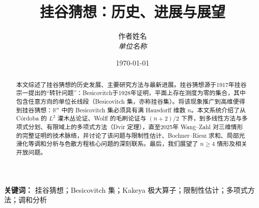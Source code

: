 \documentclass[12pt,a4paper]{article}
\title{挂谷猜想：历史、进展与展望}
\author{
    作者姓名\\
    \textit{单位名称}
}
\date{\today}
\numberwithin{equation}{section}
\begin{document}
\maketitle

\begin{abstract}
    本文综述了挂谷猜想的历史发展、主要研究方法与最新进展。挂谷猜想源于1917年挂谷宗一提出的“转针问题”：Besicovitch于1928年证明，平面上存在测度为零的集合，其中包含任意方向的单位长线段（Besicovitch 集，亦称挂谷集）。将该现象推广到高维便得到挂谷猜想：$\mathbb{R}^n$ 中的 Besicovitch 集必须具有满 Hausdorff 维数 $n$。本文系统介绍了从 Córdoba 的 $L^2$ 灌木丛论证、Wolff 的毛刷论证与 $(n+2)/2$ 下界，到多线性方法与多项式分划、有限域上的多项式方法（Dvir 定理），直至2025年 Wang--Zahl 对三维情形的完整证明的技术脉络，并讨论了该问题与限制性估计、Bochner--Riesz 求和、局部光滑化等调和分析与色散方程核心问题的深刻联系。最后，我们展望了 $n \ge 4$ 情形及相关开放问题。
\end{abstract}

\textbf{关键词：} 挂谷猜想；Besicovitch 集；Kakeya 极大算子；限制性估计；多项式方法；调和分析

\tableofcontents
\newpage












\appendix

\end{document}

